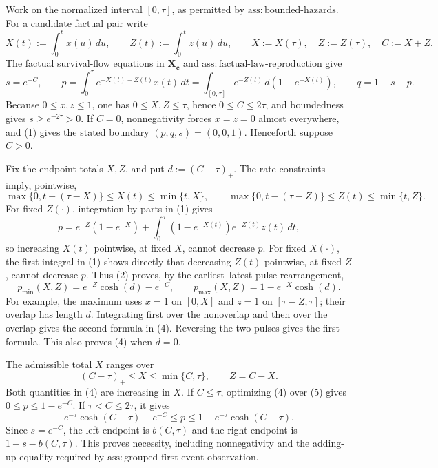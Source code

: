 Work on the normalized interval \([0,\tau]\), as permitted by \(\mathrm{ass{:}bounded\text{-}hazards}\).  For a candidate factual pair write
\[
 X(t):=\int_0^t x(u)\,du,\quad\quad Z(t):=\int_0^t z(u)\,du,
 \quad\quad X:=X(\tau),\quad Z:=Z(\tau),\quad C:=X+Z.
\]
The factual survival-flow equations in \(\mathbf X_{\mathbf c}\) and \(\mathrm{ass{:}factual\text{-}law\text{-}reproduction}\) give
\[
 s=e^{-C},\quad\quad
 p=\int_0^\tau e^{-X(t)-Z(t)}x(t)\,dt
   =\int_{[0,\tau]}e^{-Z(t)}\,d(1-e^{-X(t)}),
 \quad\quad q=1-s-p.                                           \tag{1}
\]
Because \(0\le x,z\le1\), one has \(0\le X,Z\le\tau\), hence \(0\le C\le2\tau\), and boundedness gives \(s\ge e^{-2\tau}>0\).  If \(C=0\), nonnegativity forces \(x=z=0\) almost everywhere, and (1) gives the stated boundary \((p,q,s)=(0,0,1)\).  Henceforth suppose \(C>0\).

Fix the endpoint totals \(X,Z\), and put \(d:=(C-\tau)_+\).  The rate constraints imply, pointwise,
\[
 \max\{0,t-(\tau-X)\}\le X(t)\le\min\{t,X\},
 \quad\quad
 \max\{0,t-(\tau-Z)\}\le Z(t)\le\min\{t,Z\}.             \tag{2}
\]
For fixed \(Z(\cdot)\), integration by parts in (1) gives
\[
 p=e^{-Z}(1-e^{-X})+
   \int_0^\tau (1-e^{-X(t)})e^{-Z(t)}z(t)\,dt,              \tag{3}
\]
so increasing \(X(t)\) pointwise, at fixed \(X\), cannot decrease \(p\).  For fixed \(X(\cdot)\), the first integral in (1) shows directly that decreasing \(Z(t)\) pointwise, at fixed \(Z\), cannot decrease \(p\).  Thus (2) proves, by the earliest--latest pulse rearrangement,
\[
 p_{\min}(X,Z)=e^{-Z}\cosh(d)-e^{-C},
 \quad\quad
 p_{\max}(X,Z)=1-e^{-X}\cosh(d).                           \tag{4}
\]
For example, the maximum uses \(x=1\) on \([0,X]\) and \(z=1\) on \([\tau-Z,\tau]\); their overlap has length \(d\).  Integrating first over the nonoverlap and then over the overlap gives the second formula in (4).  Reversing the two pulses gives the first formula.  This also proves (4) when \(d=0\).

The admissible total \(X\) ranges over
\[
 (C-\tau)_+\le X\le\min\{C,\tau\},\quad\quad Z=C-X.           \tag{5}
\]
Both quantities in (4) are increasing in \(X\).  If \(C\le\tau\), optimizing (4) over (5) gives \(0\le p\le1-e^{-C}\).  If \(\tau<C\le2\tau\), it gives
\[
 e^{-\tau}\cosh(C-\tau)-e^{-C}
 \le p\le
 1-e^{-\tau}\cosh(C-\tau).
\]
Since \(s=e^{-C}\), the left endpoint is \(b(C,\tau)\) and the right endpoint is \(1-s-b(C,\tau)\).  This proves necessity, including nonnegativity and the adding-up equality required by \(\mathrm{ass{:}grouped\text{-}first\text{-}event\text{-}observation}\).

